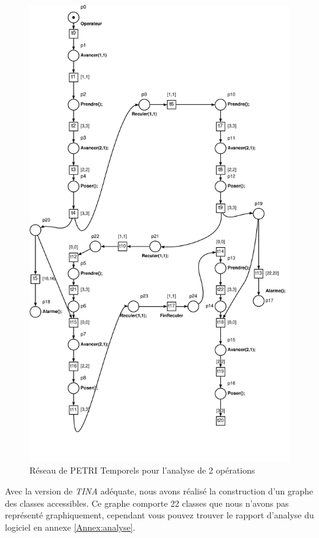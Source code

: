 \begin{figure}[!ht]
\centering
\includegraphics[height = .78\textheight]{./II/images/reseau-AnalyseIII-2.pdf}
\caption{Réseau de PETRI Temporels pour l'analyse de 2 opérations}\label{fig:RdpAnalyseIII-2}
\end{figure}

Avec la version de \emph{TINA} adéquate, nous avons réalisé la construction d'un graphe des classes accessibles. Ce graphe comporte 22 classes que nous n'avons pas représenté graphiquement, cependant vous pouvez trouver le rapport d'analyse du logiciel en annexe \ref{Annex:analyse}. 

